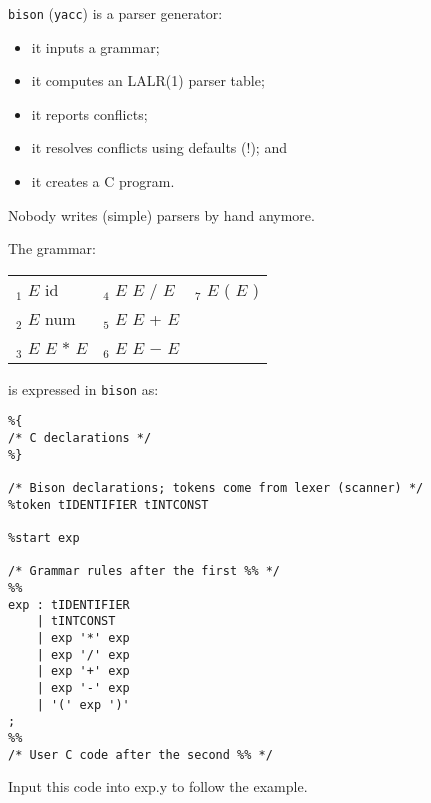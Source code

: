 \begin{slide*}
{\tt bison} ({\tt yacc}) is a parser generator:
\begin{itemize}
\item it inputs a grammar;
\item it computes an LALR(1) parser table;
\item it reports conflicts;
\item it resolves conflicts using defaults (!); and
\item it creates a C program.
\end{itemize}
\vspace*{2em}

Nobody writes (simple) parsers by hand anymore.
\vfil
\end{slide*}

\begin{slide*}
The grammar:

\begin{tabular}{l@{~~~~}l@{~~~~}l}
$_1$ $E$ \RA{} id & $_4$ $E$ \RA{} $E$ $/$ $E$ & $_7$ $E$ \RA{} ( $E$ )\\
$_2$ $E$ \RA{} num & $_5$ $E$ \RA{} $E$ + $E$ & \\
$_3$ $E$ \RA{} $E$ $*$ $E$ & $_6$ $E$ \RA{} $E$ $-$ $E$ & \\
\end{tabular}

is expressed in {\tt bison} as:

\begin{scriptsize}
\begin{verbatim}
%{
/* C declarations */
%}

/* Bison declarations; tokens come from lexer (scanner) */
%token tIDENTIFIER tINTCONST

%start exp

/* Grammar rules after the first %% */
%%
exp : tIDENTIFIER
    | tINTCONST
    | exp '*' exp
    | exp '/' exp
    | exp '+' exp
    | exp '-' exp
    | '(' exp ')'
;
%%
/* User C code after the second %% */
\end{verbatim}
\end{scriptsize}
Input this code into exp.y to follow the example.
\vfil
\end{slide*}

